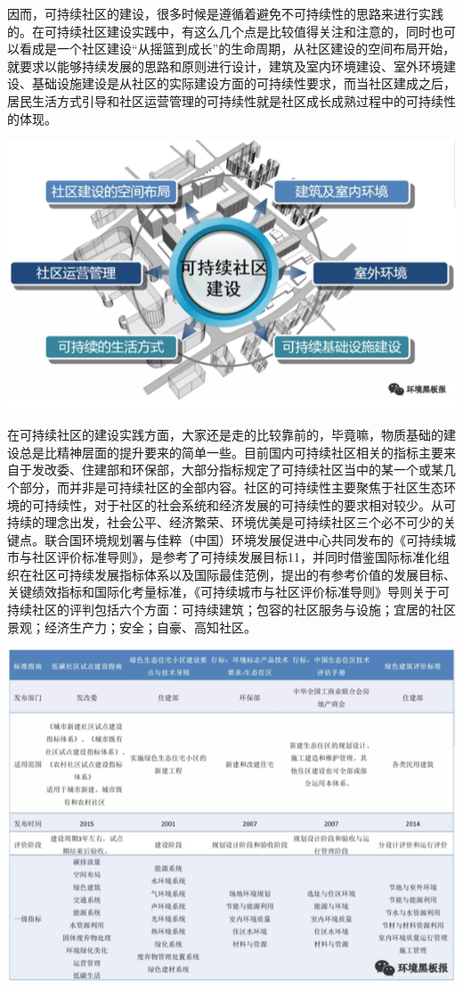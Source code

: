 \documentclass[]{book}
\begin{document}
因而，可持续社区的建设，很多时候是遵循着避免不可持续性的思路来进行实践的。在可持续社区建设实践中，有这么几个点是比较值得关注和注意的，同时也可以看成是一个社区建设``从摇篮到成长''的生命周期，从社区建设的空间布局开始，就要求以能够持续发展的思路和原则进行设计，建筑及室内环境建设、室外环境建设、基础设施建设是从社区的实际建设方面的可持续性要求，而当社区建成之后，居民生活方式引导和社区运营管理的可持续性就是社区成长成熟过程中的可持续性的体现。

\includegraphics[width=8.33in]{images/moma3}

在可持续社区的建设实践方面，大家还是走的比较靠前的，毕竟嘛，物质基础的建设总是比精神层面的提升要来的简单一些。目前国内可持续社区相关的指标主要来自于发改委、住建部和环保部，大部分指标规定了可持续社区当中的某一个或某几个部分，而并非是可持续社区的全部内容。社区的可持续性主要聚焦于社区生态环境的可持续性，对于社区的社会系统和经济发展的可持续性的要求相对较少。从可持续的理念出发，社会公平、经济繁荣、环境优美是可持续社区三个必不可少的关键点。联合国环境规划署与佳粹（中国）环境发展促进中心共同发布的《可持续城市与社区评价标准导则》，是参考了可持续发展目标11，并同时借鉴国际标准化组织在社区可持续发展指标体系以及国际最佳范例，提出的有参考价值的发展目标、关键绩效指标和国际化考量标准，《可持续城市与社区评价标准导则》导则关于可持续社区的评判包括六个方面：可持续建筑；包容的社区服务与设施；宜居的社区景观；经济生产力；安全；自豪、高知社区。

\includegraphics[width=8.33in]{images/moma4}
\end{document}
